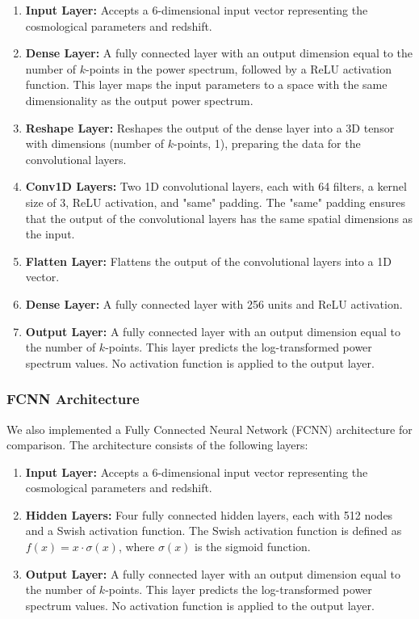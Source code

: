 \documentclass[twocolumn]{aastex631}
\begin{document}
\begin{enumerate}
    \item \textbf{Input Layer:} Accepts a 6-dimensional input vector representing the cosmological parameters and redshift.
    \item \textbf{Dense Layer:} A fully connected layer with an output dimension equal to the number of $k$-points in the power spectrum, followed by a ReLU activation function. This layer maps the input parameters to a space with the same dimensionality as the output power spectrum.
    \item \textbf{Reshape Layer:} Reshapes the output of the dense layer into a 3D tensor with dimensions (number of $k$-points, 1), preparing the data for the convolutional layers.
    \item \textbf{Conv1D Layers:} Two 1D convolutional layers, each with 64 filters, a kernel size of 3, ReLU activation, and "same" padding. The "same" padding ensures that the output of the convolutional layers has the same spatial dimensions as the input.
    \item \textbf{Flatten Layer:} Flattens the output of the convolutional layers into a 1D vector.
    \item \textbf{Dense Layer:} A fully connected layer with 256 units and ReLU activation.
    \item \textbf{Output Layer:} A fully connected layer with an output dimension equal to the number of $k$-points. This layer predicts the log-transformed power spectrum values. No activation function is applied to the output layer.
\end{enumerate}

\subsubsection{FCNN Architecture}

We also implemented a Fully Connected Neural Network (FCNN) architecture for comparison. The architecture consists of the following layers:

\begin{enumerate}
    \item \textbf{Input Layer:} Accepts a 6-dimensional input vector representing the cosmological parameters and redshift.
    \item \textbf{Hidden Layers:} Four fully connected hidden layers, each with 512 nodes and a Swish activation function. The Swish activation function is defined as $f(x) = x \cdot \sigma(x)$, where $\sigma(x)$ is the sigmoid function.
    \item \textbf{Output Layer:} A fully connected layer with an output dimension equal to the number of $k$-points. This layer predicts the log-transformed power spectrum values. No activation function is applied to the output layer.
\end{enumerate}
\end{document}
